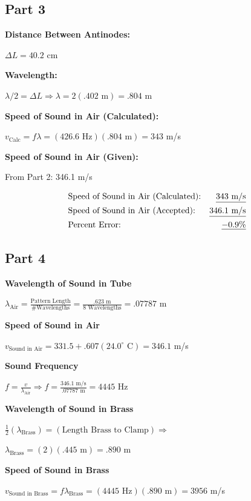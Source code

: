 \documentclass[twocolumn,english]{IEEEtran}
\theoremstyle{plain}
\theoremstyle{plain}
\begin{document}
\subsection*{Part 3} %
\textbf{Distance Between Antinodes: }

$\Delta L = 40.2$ cm

\textbf{Wavelength: }

$\lambda/2 = \Delta L \Rightarrow \lambda = 2(.402\text{ m}) = .804$ m

\textbf{Speed of Sound in Air (Calculated): }

$v_{\text{Calc}} = f\lambda = (426.6\text{ Hz})(.804\text{ m}) = 343$ m/s

\textbf{Speed of Sound in Air (Given): }

From Part 2: 346.1 m/s

\noindent\hrulefill
\begin{align*}
 &\text{Speed of Sound in Air (Calculated):}	&\text{\underline{$343$ m/s}} \\
 &\text{Speed of Sound in Air (Accepted):}	&\text{\underline{$346.1$ m/s}} \\
 &\text{Percent Error:}				&\text{\underline{$-0.9 \%$}}
\end{align*}
\noindent\hrulefill

\subsection*{Part 4}
\textbf{Wavelength of Sound in Tube}

$\lambda_{\text{Air}} = \frac{\text{Pattern Length}}{\text{\# Wavelengths}} = \frac{.623\text{ m}}{8\text{ Wavelengths}} = .07787$ m

\textbf{Speed of Sound in Air}

$v_{\text{Sound in Air}} = 331.5 + .607(24.0^{\circ}\text{ C}) = 346.1$ m/s

\textbf{Sound Frequency}

$f =\frac{v}{\lambda_{\text{Air}}}\Rightarrow f=\frac{346.1\text{ m/s}}{.07787\text{ m}} =4445$ Hz

\textbf{Wavelength of Sound in Brass}

$\frac{1}{2}(\lambda_{\text{Brass}})=(\text{Length Brass to Clamp}) \Rightarrow$

$\lambda_{\text{Brass}} = (2)(.445\text{ m}) = .890$ m

\textbf{Speed of Sound in Brass}

$v_{\text{Sound in Brass}} = f\lambda_{\text{Brass}} = (4445\text{ Hz})(.890\text{ m}) = 3956$ m/s
\end{document}
